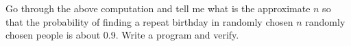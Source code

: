 Go through the above computation and tell me what is the approximate
$n$ so that the probability of finding a repeat birthday in randomly chosen
$n$ randomly chosen people is about 0.9.
Write a program and verify.
